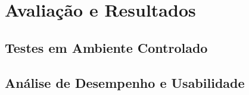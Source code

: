 \chapter{Avaliação e Resultados}
\label{chp:avaliacao}

\section{Testes em Ambiente Controlado}

\section{Análise de Desempenho e Usabilidade}